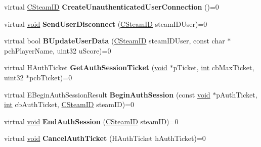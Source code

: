 \begin{DoxyCompactItemize}
\item 
\hypertarget{classISteamGameServer_a9741aab97c7b44f7cfbefb80d7a0ecf8}{}virtual \hyperlink{classCSteamID}{C\+Steam\+I\+D} {\bfseries Create\+Unauthenticated\+User\+Connection} ()=0\label{classISteamGameServer_a9741aab97c7b44f7cfbefb80d7a0ecf8}

\item 
\hypertarget{classISteamGameServer_acf9f1805ce1490ec87365487ccf3b238}{}virtual \hyperlink{SDL__audio_8h_a52835ae37c4bb905b903cbaf5d04b05f}{void} {\bfseries Send\+User\+Disconnect} (\hyperlink{classCSteamID}{C\+Steam\+I\+D} steam\+I\+D\+User)=0\label{classISteamGameServer_acf9f1805ce1490ec87365487ccf3b238}

\item 
\hypertarget{classISteamGameServer_a21f5122161830a7fe1e28d72240e4162}{}virtual bool {\bfseries B\+Update\+User\+Data} (\hyperlink{classCSteamID}{C\+Steam\+I\+D} steam\+I\+D\+User, const char $\ast$pch\+Player\+Name, uint32 u\+Score)=0\label{classISteamGameServer_a21f5122161830a7fe1e28d72240e4162}

\item 
\hypertarget{classISteamGameServer_aae0a37c9168a4802dcae8b2c055cfd36}{}virtual H\+Auth\+Ticket {\bfseries Get\+Auth\+Session\+Ticket} (\hyperlink{SDL__audio_8h_a52835ae37c4bb905b903cbaf5d04b05f}{void} $\ast$p\+Ticket, \hyperlink{SDL__thread_8h_a6a64f9be4433e4de6e2f2f548cf3c08e}{int} cb\+Max\+Ticket, uint32 $\ast$pcb\+Ticket)=0\label{classISteamGameServer_aae0a37c9168a4802dcae8b2c055cfd36}

\item 
\hypertarget{classISteamGameServer_ab0c4d1935e85463d701476761f0e05bb}{}virtual E\+Begin\+Auth\+Session\+Result {\bfseries Begin\+Auth\+Session} (const \hyperlink{SDL__audio_8h_a52835ae37c4bb905b903cbaf5d04b05f}{void} $\ast$p\+Auth\+Ticket, \hyperlink{SDL__thread_8h_a6a64f9be4433e4de6e2f2f548cf3c08e}{int} cb\+Auth\+Ticket, \hyperlink{classCSteamID}{C\+Steam\+I\+D} steam\+I\+D)=0\label{classISteamGameServer_ab0c4d1935e85463d701476761f0e05bb}

\item 
\hypertarget{classISteamGameServer_a944167b456b305a8ef900fb630dfd004}{}virtual \hyperlink{SDL__audio_8h_a52835ae37c4bb905b903cbaf5d04b05f}{void} {\bfseries End\+Auth\+Session} (\hyperlink{classCSteamID}{C\+Steam\+I\+D} steam\+I\+D)=0\label{classISteamGameServer_a944167b456b305a8ef900fb630dfd004}

\item 
\hypertarget{classISteamGameServer_aa81313a4303f97e486177d532b302a1a}{}virtual \hyperlink{SDL__audio_8h_a52835ae37c4bb905b903cbaf5d04b05f}{void} {\bfseries Cancel\+Auth\+Ticket} (H\+Auth\+Ticket h\+Auth\+Ticket)=0\label{classISteamGameServer_aa81313a4303f97e486177d532b302a1a}


\end{DoxyCompactItemize}
